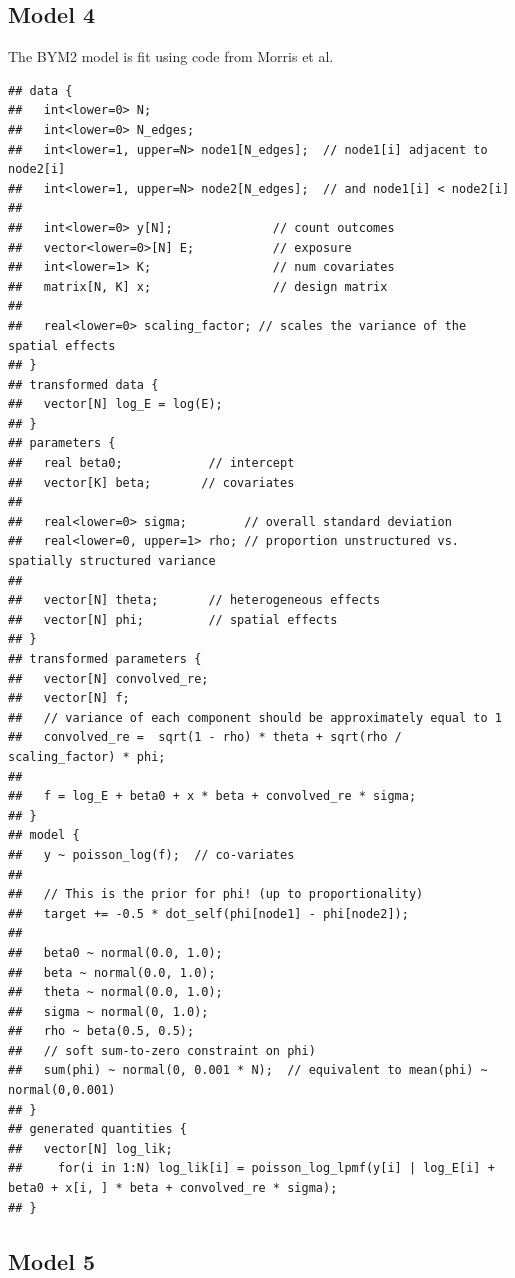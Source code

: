 \documentclass[
]{article}
\begin{document}
\hypertarget{model-4-1}{%
\subsection{Model 4}\label{model-4-1}}

The BYM2 model is fit using code from Morris et al.~

\begin{verbatim}
## data {
##   int<lower=0> N;
##   int<lower=0> N_edges;
##   int<lower=1, upper=N> node1[N_edges];  // node1[i] adjacent to node2[i]
##   int<lower=1, upper=N> node2[N_edges];  // and node1[i] < node2[i]
## 
##   int<lower=0> y[N];              // count outcomes
##   vector<lower=0>[N] E;           // exposure
##   int<lower=1> K;                 // num covariates
##   matrix[N, K] x;                 // design matrix
## 
##   real<lower=0> scaling_factor; // scales the variance of the spatial effects
## }
## transformed data {
##   vector[N] log_E = log(E);
## }
## parameters {
##   real beta0;            // intercept
##   vector[K] beta;       // covariates
## 
##   real<lower=0> sigma;        // overall standard deviation
##   real<lower=0, upper=1> rho; // proportion unstructured vs. spatially structured variance
## 
##   vector[N] theta;       // heterogeneous effects
##   vector[N] phi;         // spatial effects
## }
## transformed parameters {
##   vector[N] convolved_re;
##   vector[N] f; 
##   // variance of each component should be approximately equal to 1
##   convolved_re =  sqrt(1 - rho) * theta + sqrt(rho / scaling_factor) * phi;
##   
##   f = log_E + beta0 + x * beta + convolved_re * sigma;
## }
## model {
##   y ~ poisson_log(f);  // co-variates
## 
##   // This is the prior for phi! (up to proportionality)
##   target += -0.5 * dot_self(phi[node1] - phi[node2]);
## 
##   beta0 ~ normal(0.0, 1.0);
##   beta ~ normal(0.0, 1.0);
##   theta ~ normal(0.0, 1.0);
##   sigma ~ normal(0, 1.0);
##   rho ~ beta(0.5, 0.5);
##   // soft sum-to-zero constraint on phi)
##   sum(phi) ~ normal(0, 0.001 * N);  // equivalent to mean(phi) ~ normal(0,0.001)
## }
## generated quantities {
##   vector[N] log_lik; 
##     for(i in 1:N) log_lik[i] = poisson_log_lpmf(y[i] | log_E[i] + beta0 + x[i, ] * beta + convolved_re * sigma);
## }
\end{verbatim}

\hypertarget{model-5-1}{%
\subsection{Model 5}\label{model-5-1}}
\end{document}

